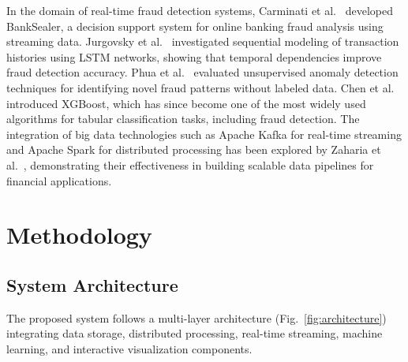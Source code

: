 \documentclass[conference]{IEEEtran}
\begin{document}
In the domain of real-time fraud detection systems, Carminati et al.~\cite{carminati2015} developed BankSealer, a decision support system for online banking fraud analysis using streaming data. Jurgovsky et al.~\cite{jurgovsky2018} investigated sequential modeling of transaction histories using LSTM networks, showing that temporal dependencies improve fraud detection accuracy. Phua et al.~\cite{phua2004} evaluated unsupervised anomaly detection techniques for identifying novel fraud patterns without labeled data. Chen et al.~\cite{chen2016} introduced XGBoost, which has since become one of the most widely used algorithms for tabular classification tasks, including fraud detection. The integration of big data technologies such as Apache Kafka for real-time streaming and Apache Spark for distributed processing has been explored by Zaharia et al.~\cite{zaharia2016}, demonstrating their effectiveness in building scalable data pipelines for financial applications.

\section{Methodology}

\subsection{System Architecture}
The proposed system follows a multi-layer architecture (Fig.~\ref{fig:architecture}) integrating data storage, distributed processing, real-time streaming, machine learning, and interactive visualization components.
\end{document}
